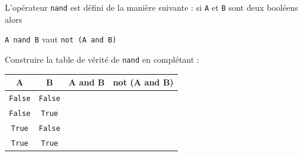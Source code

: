 \begin{exercice}
	L'opérateur \texttt{nand} est défini de la manière suivante : si \texttt{A} et \texttt{B} sont deux booléens alors
	\begin{center}
		\texttt{A nand B} vaut \texttt{not (A and B)}
	\end{center}
	Construire la table de vérité de \texttt{nand} en complétant :
	\begin{center}
		\tabstyled
		\begin{tabular}{|c|c|c|c|}
			\hline
			\ccell A                   & \ccell B                   & \ccell A and B & \ccell not (A and B) \\
			\hline
			\texttt{False} & \texttt{False} &                &                      \\
			\hline
			\texttt{False} & \texttt{True}  &                &                      \\
			\hline
			\texttt{True}  & \texttt{False} &                &                      \\
			\hline
			\texttt{True}  & \texttt{True}  &                &                      \\
			\hline
		\end{tabular}
	\end{center}
\end{exercice}


